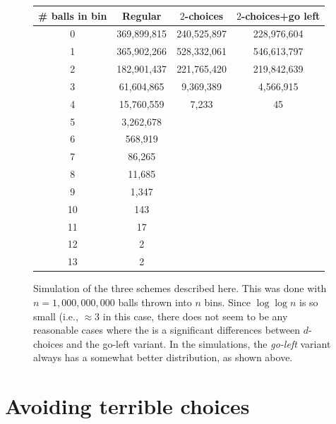 \begin{figure}
    \centering%
       \begin{tabular}{|c|c|c|c|}
         \hline
         \# balls in bin & Regular & $2$-choices & $2$-choices+go left\\ 
         \hline
         \hline
         0 & 369,899,815  &  240,525,897  &  228,976,604 \\
         1 & 365,902,266  &  528,332,061  &  546,613,797 \\
         2 & 182,901,437  &  221,765,420  &  219,842,639 \\
         3 &  61,604,865  &    9,369,389  &    4,566,915 \\
         4 &  15,760,559  &        7,233  &           45 \\
         5 &   3,262,678  &               &              \\
         6 &     568,919  &               &              \\
         7 &      86,265  &               &              \\
         8 &      11,685  &               &              \\
         9 &       1,347  &               &              \\
         10 &         143  &               &              \\
         11 &          17  &               &              \\
         12 &           2  &               &              \\
         13 &           2  &               &
         \\
         \hline
       \end{tabular}%
    \caption{Simulation of the three schemes described here. This was
    done with $n=1,000,000,000$ balls thrown into $n$ bins. Since
    $\log \log n$ is so small (i.e., $\approx 3$ in this case, there
    does not seem to be any reasonable cases where the is a
    significant differences between $d$-choices and the go-left
    variant. In the simulations, the \emph{go-left} variant always has
    a somewhat better distribution, as shown above.}
\end{figure}



\section{Avoiding terrible choices}

